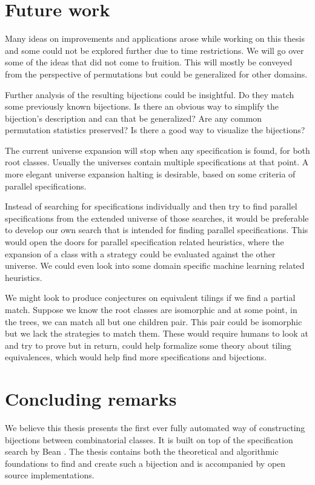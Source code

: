 \label{ch:conclusion}

\section{Future work}\label{s:fw}
Many ideas on improvements and applications arose while working on this thesis and some could not be explored further due to time restrictions. We will go over some of the ideas that did not come to fruition. This will mostly be conveyed from the perspective of permutations but could be generalized for other domains.

Further analysis of the resulting bijections could be insightful. Do they match some previously known bijections. Is there an obvious way to simplify the bijection's description and can that be generalized? Are any common permutation statistics preserved? Is there a good way to visualize the bijections?

The current universe expansion will stop when any specification is found, for both root classes. Usually the universes contain multiple specifications at that point. A more elegant universe expansion halting is desirable, based on some criteria of parallel specifications.

Instead of searching for specifications individually and then try to find parallel specifications from the extended universe of those searches, it would be preferable to develop our own search that is intended for finding parallel specifications. This would open the doors for parallel specification related heuristics, where the expansion of a class with a strategy could be evaluated against the other universe. We could even look into some domain specific machine learning related heuristics. 

We might look to produce conjectures on equivalent tilings if we find a partial match. Suppose we know the root classes are isomorphic and at some point, in the trees, we can match all but one children pair. This pair could be isomorphic but we lack the strategies to match them. These would require humans to look at and try to prove but in return, could help formalize some theory about tiling equivalences, which would help find more specifications and bijections.

\section{Concluding remarks}
We believe this thesis presents the first ever fully automated way of constructing bijections between combinatorial classes. It is built on top of the specification search by Bean \cite{BeanPhd:phd}. The thesis contains both the theoretical and algorithmic foundations to find and create such a bijection and is accompanied by open source implementations.

